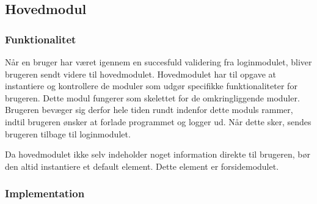 \subsection{Hovedmodul}
\label{sub:hovedmodul}

\subsubsection{Funktionalitet}
\label{ssub:hovedmodul_funktionalitet}


Når en bruger har været igennem en succesfuld validering fra loginmodulet, bliver brugeren sendt videre til hovedmodulet. Hovedmodulet har til opgave at instantiere og kontrollere de moduler som udgør specifikke funktionaliteter for brugeren. Dette modul fungerer som skelettet for de omkringliggende moduler. Brugeren bevæger sig derfor hele tiden rundt indenfor dette moduls rammer, indtil brugeren ønsker at forlade programmet og logger ud. Når dette sker, sendes brugeren tilbage til loginmodulet. 

Da hovedmodulet ikke selv indeholder noget information direkte til brugeren, bør den altid instantiere et default element. Dette element er forsidemodulet.

\subsubsection{Implementation}
\label{ssub:hovedmodul_implementation}

